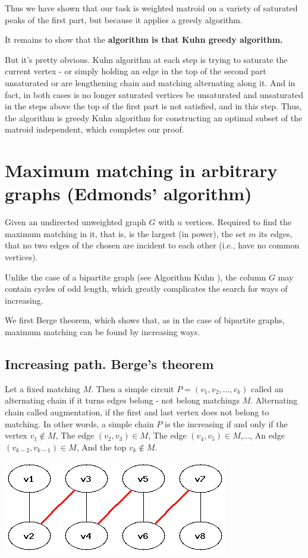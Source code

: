 Thus we have shown that our task is weighted matroid on a variety of saturated peaks of the first part, but because it applies a greedy algorithm.

It remains to show that the \textbf{algorithm is that Kuhn greedy algorithm.}

But it's pretty obvious. Kuhn algorithm at each step is trying to saturate the current vertex - or simply holding an edge in the top of the second part unsaturated or are lengthening chain and matching alternating along it. And in fact, in both cases is no longer saturated vertices be unsaturated and unsaturated in the steps above the top of the first part is not satisfied, and in this step. Thus, the algorithm is greedy Kuhn algorithm for constructing an optimal subset of the matroid independent, which completes our proof.

\section{ Maximum matching in arbitrary graphs (Edmonds' algorithm) }
Given an undirected unweighted graph $G$ with $n$ vertices. Required to find the maximum matching in it, that is, is the largest (in power), the set $m$ its edges, that no two edges of the chosen are incident to each other (i.e., have no common vertices).

Unlike the case of a bipartite graph (see Algorithm Kuhn ), the column $G$ may contain cycles of odd length, which greatly complicates the search for ways of increasing.

We first Berge theorem, which shows that, as in the case of bipartite graphs, maximum matching can be found by increasing ways.

\subsection{ Increasing path. Berge's theorem }

Let a fixed matching $M$. Then a simple circuit $P = (v_1, v_2, \ldots, v_k)$ called an alternating chain if it turns edges belong - not belong matchings $M$. Alternating chain called augmentation, if the first and last vertex does not belong to matching. In other words, a simple chain $P$ is the increasing if and only if the vertex $v_1 \not \in M$, The edge $(v_2, v_3) \in M$, The edge $(v_4, v_5) \in M$,..., An edge $(v_ {k-2}, v_ {k-1}) \in M$, And the top $v_k \not \in M$.

\includegraphics[scale=0.5]{1.png}

